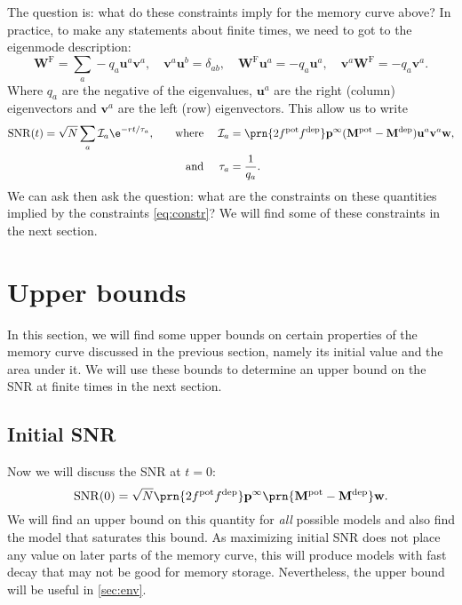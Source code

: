 \documentclass{article} %
\DeclareMathOperator{\snr}{SNR}
\newcommand{\pr}{\mathbf{p}}
\newcommand{\eq}{\pr^\infty}
\newcommand{\w}{\mathbf{w}}
\newcommand{\W}{\mathbf{W}}
\newcommand{\M}{\mathbf{M}}
\newcommand{\frg}{\W^{\mathrm{F}}}
\newcommand{\pot}{^{\text{pot}}}
\newcommand{\dep}{^{\text{dep}}}
\newcommand{\uv}{\mathbf{u}}
\newcommand{\vv}{\mathbf{v}}
\newcommand{\CI}{\mathcal{I}}
\begin{document}
The question is: what do these constraints imply for the memory curve above?
In practice, to make any statements about finite times, we need to got to the eigenmode description:
%
\begin{equation}\label{eq:eigendecomp}
  \frg = \sum_a -q_a \uv^a \vv^a,
  \quad
  \vv^a \uv^b = \delta_{ab},
  \quad
  \frg \uv^a = -q_a \uv^a,
  \quad
  \vv^a \frg = -q_a \vv^a.
\end{equation}
%
Where $q_a$ are the negative of the eigenvalues, $\uv^a$ are the right (column) eigenvectors and $\vv^a$ are the left (row) eigenvectors.
This allow us to write
%
\begin{equation}\label{eq:SNReigen}
\begin{aligned}
  \snr(t) &= \sqrt{N}\sum_a \CI_a \e^{-rt/\tau_a},
  &\quad \text{where}&\;&
  \CI_a &= \prn{2 f\pot f\dep} \eq (\M\pot-\M\dep) \uv^a  \vv^a \w,\\&
  & \text{and}&&
  \tau_a &= \frac{1}{q_a}.
\end{aligned}
\end{equation}
%
We can ask then ask the question: what are the constraints on these quantities implied by the constraints \eqref{eq:constr}?
We will find some of these constraints in the next section.





\section{Upper bounds}\label{sec:bounds}

In this section, we will find some upper bounds on certain properties of the memory curve discussed in the previous section, namely its initial value and the area under it.
We will use these bounds to determine an upper bound on the SNR at finite times in the next section.


\subsection{Initial SNR}\label{sec:initial}

Now we will discuss the SNR at $t=0$:
%
\begin{equation}\label{eq:init}
  \snr(0) = \sqrt{N}\prn{2 f\pot f\dep} \eq \prn{\M\pot-\M\dep} \w.
\end{equation}
%
We will find an upper bound on this quantity for \emph{all} possible models and also find the model that saturates this bound.
As maximizing initial SNR does not place any value on later parts of the memory curve, this will produce models with fast decay that may not be good for memory storage.
Nevertheless, the upper bound will be useful in \autoref{sec:env}.
\end{document}
